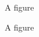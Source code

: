 \documentclass{article}
\begin{document}
\begin{figure}
\centering
A figure
\caption{A figure}
\end{figure}
\end{document}
